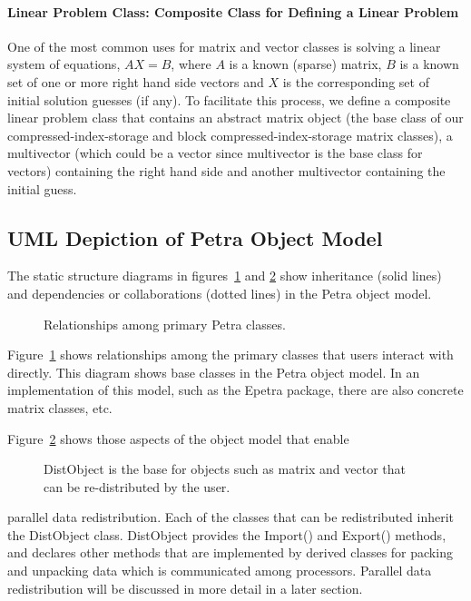 \documentclass[10pt,relax]{PetraObjectModel}
\begin{document}
\paragraph{Linear Problem Class:  Composite Class for Defining a Linear Problem}

One of the most common uses for matrix and vector classes is solving
a linear system of equations, $AX = B$, where $A$ is a known
(sparse) matrix, $B$ is a known set of one or more right hand side
vectors and $X$ is the corresponding set of initial solution guesses
(if any).  To facilitate this process, we define a composite linear
problem class that contains an abstract matrix object (the base
class of our compressed-index-storage and block
compressed-index-storage matrix classes), a multivector (which could
be a vector since multivector is the base class for vectors)
containing the right hand side and another multivector containing
the initial guess.

\subsection{UML Depiction of Petra Object Model}

The static structure diagrams in figures~\ref{matvecmap} and \ref{distobj}
show inheritance (solid lines) and dependencies or collaborations (dotted
lines) in the Petra object model.
\begin{figure}[ht]
\begin{center}
\caption{Relationships among primary Petra classes.}
\label{matvecmap}
\end{center}
\end{figure}
Figure~\ref{matvecmap} shows relationships among the primary classes that users
interact with directly.  This
diagram shows base classes in the Petra object model. In an implementation of
this model, such as the Epetra package, there are also concrete matrix classes,
etc.

Figure~\ref{distobj} shows those aspects of the object model that enable
\begin{figure}[ht]
\begin{center}
\caption{DistObject is the base for objects such as matrix and vector that can be re-distributed by the user.}
\label{distobj}
\end{center}
\end{figure}
parallel data redistribution. Each of the classes that can be redistributed
inherit the DistObject class. DistObject provides the Import() and Export()
methods, and declares other methods that are implemented by derived classes for
packing and unpacking data which is communicated among processors. Parallel
data redistribution will be discussed in more detail in a later section.
\end{document}
